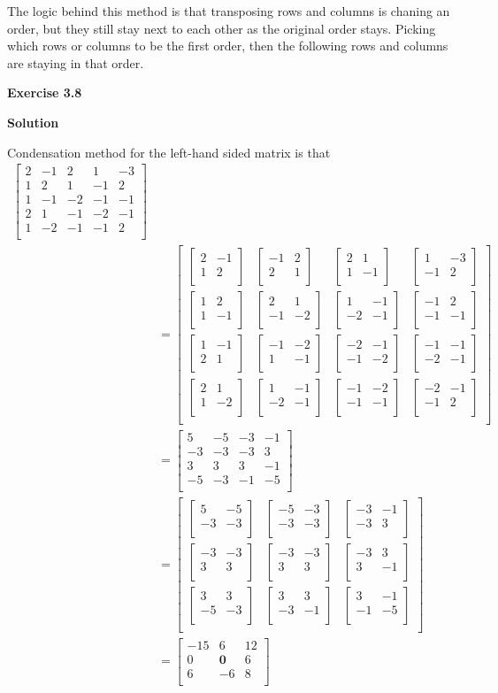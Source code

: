 \documentclass[12pt]{article}
\newcommand{\matxx}[2] {
\begin{bmatrix}
  #1 \\
  #2 \\
\end{bmatrix}
}
\newcommand{\matxxx}[3] {
\begin{bmatrix}
  #1 \\
  #2 \\
  #3 \\
\end{bmatrix}
}
\newcommand{\matxxxx}[4] {
\begin{bmatrix}
  #1 \\
  #2 \\
  #3 \\
  #4 \\
\end{bmatrix}
}
\newcommand{\matxxxxx}[5] {
\begin{bmatrix}
  #1 \\
  #2 \\
  #3 \\
  #4 \\
  #5 \\
\end{bmatrix}
}
\begin{document}
The logic behind this method is that
transposing rows and columns is chaning an order,
but they still stay next to each other as the original order stays. Picking which rows or columns to be the first order,
then the following rows and columns are staying in that order.

\begin{center}
\end{center}

\bigskip

\textbf{Exercise 3.8}

\bigskip

\textbf{Solution}

Condensation method for the left-hand sided matrix is that
\[
\begin{split}
  \matxxxxx{2 & -1 & 2 & 1 & -3}{1 & 2 & 1 & -1 & 2}{1 & -1 & -2 & -1 & -1}{2 & 1 & -1 & -2 & -1}{1 & -2 & -1 & -1 & 2} \\
  & = \matxxxx
  {
    \matxx{2 & -1}{1 & 2} &
    \matxx{-1 & 2}{2 & 1} &
    \matxx{2 & 1}{1 & -1} &
    \matxx{1 & -3}{-1 & 2}
  }
  {
    \matxx{1 & 2}{1 & -1} &
    \matxx{2 & 1}{-1 & -2} &
    \matxx{1 & -1}{-2 & -1} &
    \matxx{-1 & 2}{-1 & -1}
  }
  {
    \matxx{1 & -1}{2 & 1} &
    \matxx{-1 & -2}{1 & -1} &
    \matxx{-2 & -1}{-1 & -2} &
    \matxx{-1 & -1}{-2 & -1}
  }
  {
    \matxx{2 & 1}{1 & -2} &
    \matxx{1 & -1}{-2 & -1} &
    \matxx{-1 & -2}{-1 & -1} &
    \matxx{-2 & -1}{-1 & 2}
  } \\
  & = \matxxxx{5 & -5 & -3 & -1}{-3 & -3 & -3 & 3}{3 & 3 & 3 & -1}{-5 & -3 & -1 & -5} \\
  & = \matxxx
  {
    \matxx{5 & -5}{-3 & -3} &
    \matxx{-5 & -3}{-3 & -3} &
    \matxx{-3 & -1}{-3 & 3}
  }
  {
    \matxx{-3 & -3}{3 & 3} &
    \matxx{-3 & -3}{3 & 3} &
    \matxx{-3 & 3}{3 & -1}
  }
  {
    \matxx{3 & 3}{-5 & -3} &
    \matxx{3 & 3}{-3 & -1} &
    \matxx{3 & -1}{-1 & -5}
  } \\
  & = \matxxx{-15 & 6 & 12}{0 & \mathbf{0} & 6}{6 & -6 & 8}
\end{split}
\]
\end{document}
